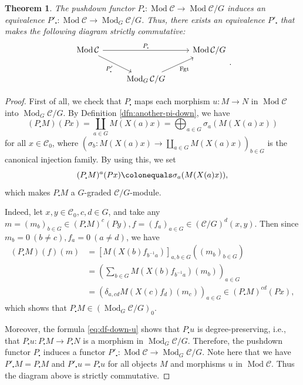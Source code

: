 \documentclass{surv-l}
\numberwithin{equation}{chapter}
\numberwithin{figure}{chapter}
\theoremstyle{plain}
\newtheorem{thm}{Theorem}[section]
\theoremstyle{definition}
\theoremstyle{remark}
\newcommand{\Ar}[3]{\ar[from={#1}, to={#2}, #3]}
\DeclareMathOperator{\Mod}{Mod}
\DeclareMathOperator{\Fgt}{Fgt}
\begin{document}
\begin{thm}\label{remov-grading}
The pushdown functor $P_{\centerdot}\colon \Mod {\mathcal{C}} \to \Mod {\mathcal{C}}/G$ induces
an equivalence $P'_{\centerdot}\colon \Mod {\mathcal{C}} \to \Mod_{G}{\mathcal{C}}/G$.
Thus, there exists an equivalence $P'_{\centerdot}$ that makes the following diagram
strictly commutative:
\[
\begin{tikzcd}[column sep=2.5em]
\Mod {\mathcal{C}} && \Mod {\mathcal{C}}/G\\
  & \Mod_{G}{\mathcal{C}}/G
\Ar{1-1}{1-3}{"P_{\centerdot}"}
\Ar{1-1}{2-2}{"P'_{\centerdot}" '}
\Ar{2-2}{1-3}{"\Fgt" '}
\end{tikzcd}.
\]
\end{thm}

\setcounter{clm}{0}\begin{proof}
First of all, we check that $P_{\centerdot}$ maps each morphism $u\colon M \to N$ in $\Mod {\mathcal{C}}$
into $\Mod_{G} {\mathcal{C}}/G$.
By Definition \ref{dfn:another-pi-down}, we have
\[
(P_{\centerdot} M)(P x) = \coprod_{a\in G} M(X(a)x) = \bigoplus_{a\in G}\sigma_a(M(X(a)x))
\]
for all $x \in {\mathcal{C}}_0$,
where $(\sigma_b \colon M(X(a)x) \to \coprod_{a\in G} M(X(a)x))_{b\in G}$
is the canonical injection family.
By using this, we set
\begin{equation}\label{grading-pi-down}
(P_{\centerdot} M)^{a}(P x)\colonequals  \sigma_a(M(X(a)x)),
\end{equation}
which makes $P_{\centerdot} M$ a $G$-graded ${\mathcal{C}}/G$-module.

Indeed, let $x, y \in {\mathcal{C}}_0, c, d \in G$, and take any
$m = (m_b)_{b \in G}\in (P_{\centerdot} M)^c(Py), f = (f_a)_{a \in G} \in ({\mathcal{C}}/G)^d(x,y)$.
Then since $m_b = 0\ (b \ne c), f_a = 0\ (a \ne d)$, we have
\[
\begin{aligned}
(P_{\centerdot} M)(f)(m) &= [M(X(b)f_{b^{-1} a})]_{a,b\in G}((m_b)_{b \in G})\\
&= \left(\sum_{b \in G} M(X(b)f_{b^{-1} a})(m_b)\right)_{a\in G}\\
&= (\delta_{a, cd} M(X(c)f_d)(m_c))_{a\in G}
\in (P_{\centerdot} M)^{cd}(Px),
\end{aligned}
\]
which shows that $P_{\centerdot} M \in (\Mod_{G}{\mathcal{C}}/G)_0$.

Moreover, the formula \eqref{eq:df-down-u} shows that $P_{\centerdot} u$ is degree-preserving,
i.e., that $P_{\centerdot} u\colon P_{\centerdot} M \to P_{\centerdot} N$ is a morphism in $\Mod_{G}{\mathcal{C}}/G$.
Therefore, the pushdown functor $P_{\centerdot}$ induces a functor
$P'_{\centerdot}\colon \Mod{\mathcal{C}} \to \Mod_{G}{\mathcal{C}}/G$.
Note here that we have
$P'_{\centerdot} M = P_{\centerdot} M$ and $P'_{\centerdot} u = P_{\centerdot} u$
for all objects $M$ and morphisms $u$ in $\Mod{\mathcal{C}}$.
Thus the diagram above is strictly commutative.




\end{proof}
\end{document}
